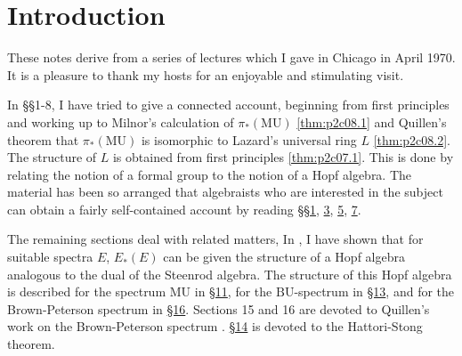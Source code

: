 \documentclass[../main]{subfiles}
\begin{document}
\label{sec:p2c0}

\chapter{Introduction}


These notes derive from a series of lectures which I gave in Chicago in April 1970. It is a pleasure to thank my hosts for an enjoyable and stimulating visit.

In \S\S1-8, I have tried to give a connected account, beginning from first principles and working up to Milnor's calculation of $\pi_\ast(\mathrm{MU})$ \eqref{thm:p2c08.1} and Quillen's theorem that $\pi_\ast(\mathrm{MU})$ is isomorphic to Lazard's universal ring $L$ \eqref{thm:p2c08.2}. The structure of $L$ is obtained from first principles \eqref{thm:p2c07.1}. This is done by relating the notion of a formal group to the notion of a Hopf algebra. The material has been so arranged that algebraists who are interested in the subject can obtain a fairly self-contained account by reading \S\S\hyperref[sec:p2c1]{1}, \hyperref[sec:p2c3]{3}, \hyperref[sec:p2c5]{5}, \hyperref[sec:p2c7]{7}.

The remaining sections deal with related matters, In \cite[Lecture 3]{adams3}, I have shown that for suitable spectra $E$, $E_\ast(E)$ can be given the structure of a Hopf algebra analogous to the dual of the Steenrod algebra. The structure of this Hopf algebra is described for the spectrum $\mathrm{MU}$ in \hyperref[sec:p2c11]{\S 11}, for the $\mathrm{BU}$-spectrum in \hyperref[sec:p2c13]{\S 13}, and for the Brown-Peterson spectrum in \hyperref[sec:p2c16]{\S 16}. Sections 15 and 16 are devoted to Quillen's work on the Brown-Peterson spectrum \cite{brownpeterson}. \hyperref[sec:p2c14]{\S 14} is devoted to the Hattori-Stong theorem. 
\end{document}
